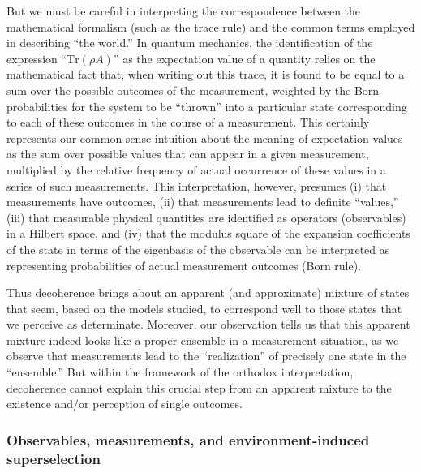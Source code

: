 \documentclass[rmp,aps,amsmath,amsfonts,noshowkeys,noshowpacs,12pt]{revtex4}
\begin{document}
But we must be careful in interpreting the correspondence between the
mathematical formalism (such as the trace rule) and the common terms
employed in describing ``the world.'' In quantum mechanics, the
identification of the expression ``$\text{Tr}(\rho A)$'' as the
expectation value of a quantity relies on the mathematical fact that,
when writing out this trace, it is found to be equal to a sum over the
possible outcomes of the measurement, weighted by the Born
probabilities for the system to be ``thrown'' into a particular state
corresponding to each of these outcomes in the course of a
measurement. This certainly represents our common-sense intuition
about the meaning of expectation values as the sum over possible
values that can appear in a given measurement, multiplied by the
relative frequency of actual occurrence of these values in a series of
such measurements. This interpretation, however, presumes (i) that
measurements have outcomes, (ii) that measurements lead to definite
``values,'' (iii) that measurable physical quantities are identified as
operators (observables) in a Hilbert space, and (iv) that the modulus
square of the expansion coefficients of the state in terms of the
eigenbasis of the observable can be interpreted as representing
probabilities of actual measurement outcomes (Born rule).

Thus decoherence brings about an apparent (and approximate) mixture of
states that seem, based on the models studied, to correspond well to
those states that we perceive as determinate.  Moreover, our
observation tells us that this apparent mixture indeed looks like a
proper ensemble in a measurement situation, as we observe that
measurements lead to the ``realization'' of precisely one state in the
``ensemble.''  But within the framework of the orthodox
interpretation, decoherence cannot explain this crucial step from an
apparent mixture to the existence and/or perception of single
outcomes.


\subsubsection{Observables, measurements, and environment-induced superselection}
\end{document}
